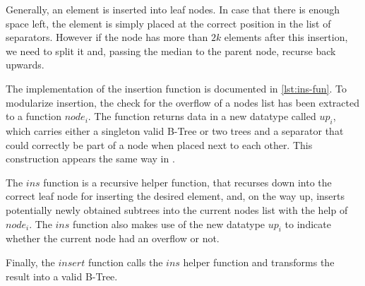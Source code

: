 Generally, an element is inserted into leaf nodes.
In case that there is enough space left, the element is simply placed at the correct
position in the list of separators.
However if the node has more than $2k$ elements after this insertion,
we need to split it and, passing the median to the parent node,
recurse back upwards.

The implementation of the insertion function is documented in \autoref{lst:ins-fun}.
To modularize insertion, the check for the overflow of a nodes list has been
extracted to a function $node_i$.
The function returns data in a new datatype called $up_i$, which
carries either a singleton valid B-Tree or two trees and a separator
that could correctly be part of a node when placed next to each other.
This construction appears the same way in \parencite{DBLP:conf/itp/Nipkow16}.

The $ins$ function is a recursive helper function,
that recurses down into the correct leaf node for inserting the desired element,
and, on the way up, inserts potentially newly obtained subtrees into the
current nodes list with the help of $node_i$.
The $ins$ function also makes use of the new datatype $up_i$ to indicate whether
the current node had an overflow or not.

Finally, the $insert$ function calls the $ins$ helper function
and transforms the result into a valid B-Tree.

